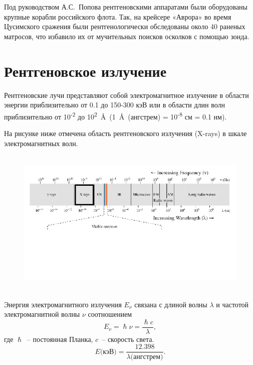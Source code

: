 \documentclass[a4paper,14pt, openany, twoside, draft]{extbook} %
\newcommand{\AAA}{\textup{\AA}}
\begin{document}
Под руководством А.С.~Попова рентгеновскими аппаратами были оборудованы крупные корабли российского флота. Так, на крейсере «Аврора» во время Цусимского сражения были рентгенологически обследованы около 40 раненых матросов, что избавило их от мучительных поисков осколков с помощью зонда.


\section{Рентгеновское излучение}
\label{sec:spectrumtype}

Рентгеновские лучи представляют собой электромагнитное излучение в области энергии приблизительно от 0.1 до 150-300 кэВ или в области длин волн приблизительно от 10\textsuperscript{-2} до 10\textsuperscript{2}~\AAA~(1~\AAA~(ангстрем) = 10\textsuperscript{-8} см = 0.1 нм).

На рисунке ниже отмечена область рентгеновского излучения ({X}-rays) в шкале электромагнитных волн.

\begin{figure}
\centering
\includegraphics[width=16.595cm,height=7.114cm]{a12-img001.png}
\end{figure}
Энергия электромагнитного излучения $E_{\nu}$  связана с длиной волны ${\lambda}$ и частотой электромагнитной волны ${\nu}$ соотношением
\begin{equation}
\label{eq:energyrad}
E_{\nu }=\mathit{\hslash \nu}=\frac{\hslash c}{\lambda},
\end{equation}
где $\hslash$~-- постоянная Планка, $c$~-- скорость света.
\begin{equation}
\label{eq:energyrad1}
\mathit{E}{\text{(кэВ)}}=\frac{12.398}{\lambda{\text{(ангстрем)}}}.
\end{equation}
\end{document}
